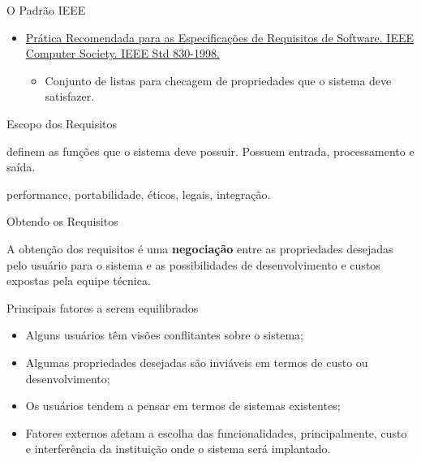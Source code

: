 \begin{frame}{O Padrão IEEE}
  \begin{itemize}
  \item
    \href{http://holanda.xyz/files/720574.pdf}{Prática
      Recomendada para as Especificações de Requisitos de
      Software. IEEE Computer Society. IEEE Std 830-1998.}

    \begin{itemize}
    \item Conjunto de listas para checagem de propriedades que o sistema
      deve satisfazer.
    \end{itemize}
  \end{itemize}
\end{frame}

\begin{frame}{Escopo dos Requisitos}
  \begin{description}[<+->]
  \item[Requisitos Funcionais] definem as funções que o sistema deve
    possuir. Possuem entrada, processamento e saída.
  \item[Requisitos Não-Funcionais] performance, portabilidade, éticos,
    legais, integração.
  \end{description}
\end{frame}

\begin{frame}{Obtendo os Requisitos}
  
  A obtenção dos requisitos é uma {\bf negociação} entre as propriedades
  desejadas pelo usuário para o sistema e as possibilidades de
  desenvolvimento e custos expostas pela equipe técnica.

  \pause

  \begin{block}{Principais fatores a serem equilibrados}
  \begin{itemize}[<+->]
  \item Alguns usuários têm visões conflitantes sobre o sistema;
  \item Algumas propriedades desejadas são inviáveis em termos de custo ou 
    desenvolvimento;
  \item Os usuários tendem a pensar em termos de sistemas existentes;
  \item Fatores externos afetam a escolha das funcionalidades,
    principalmente, custo e interferência da instituição onde o
    sistema será implantado.
  \end{itemize}
\end{block}

\end{frame}

